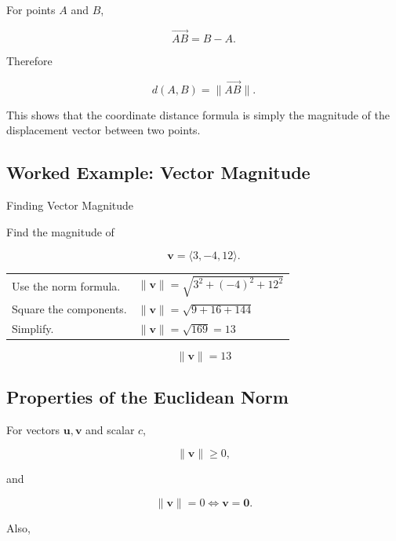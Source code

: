 For points \(A\) and \(B\),

\[ \overrightarrow{AB}=B-A. \]

Therefore

\[
\boxed{
d(A,B)=\|\overrightarrow{AB}\|.
}
\]

This shows that the coordinate distance formula is simply the magnitude of
the displacement vector between two points.

\subsection{Worked Example: Vector Magnitude}
\label{subsec:worked-vector-magnitude}

\begin{workedexamplebox}{Finding Vector Magnitude}

Find the magnitude of

\[ \mathbf{v}=\langle3,-4,12\rangle. \]

\begin{tabularx}{\textwidth}{@{}>{\raggedright\arraybackslash}p{}X@{}}
Use the norm formula. &
\(\|\mathbf{v}\|=\sqrt{3^2+(-4)^2+12^2}\)\\
Square the components. &
\(\|\mathbf{v}\|=\sqrt{9+16+144}\)\\
Simplify. &
\(\|\mathbf{v}\|=\sqrt{169}=13\)
\end{tabularx}

\begin{answerbox}
\[ \boxed{\|\mathbf{v}\|=13} \]
\end{answerbox}
\end{workedexamplebox}

\subsection{Properties of the Euclidean Norm}
\label{subsec:euclidean-norm-properties}

For vectors \(\mathbf{u},\mathbf{v}\) and scalar \(c\),

\[
\|\mathbf{v}\|\geq0,
\]

and

\[ \|\mathbf{v}\|=0\iff\mathbf{v}=\mathbf{0}. \]

Also,

